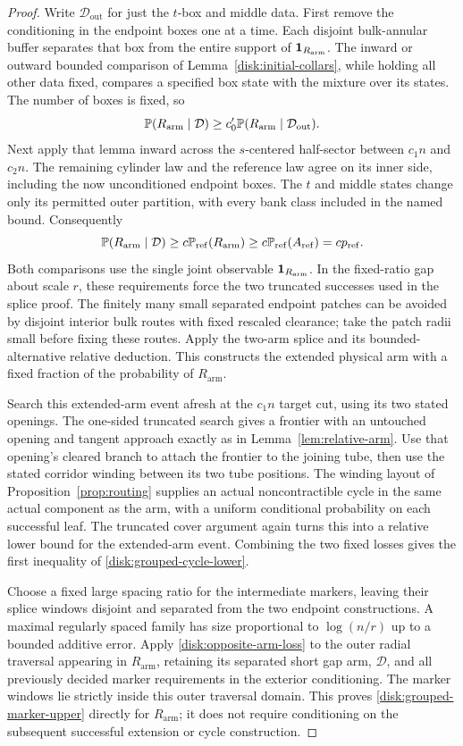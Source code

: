 \begin{proof}
Write $\mathcal D_{\mathrm{out}}$ for just the $t$-box and middle data.
First remove the conditioning in the endpoint boxes one at a time.
Each disjoint bulk-annular buffer separates that box from the entire
support of $\mathbf 1_{R_{\mathrm{arm}}}$. The inward or outward bounded
comparison of Lemma~\ref{disk:initial-collars}, while holding all
other data fixed, compares a specified box state with the mixture over
its states. The number of boxes is fixed, so
\[
 \mathbb P(R_{\mathrm{arm}}\mid\mathcal D)
 \ge c_0'\mathbb P(R_{\mathrm{arm}}\mid\mathcal D_{\mathrm{out}}).
\]
Next apply that lemma inward across the $s$-centered half-sector
between $c_1n$ and $c_2n$. The remaining cylinder law and the
reference law agree on its inner side, including the now unconditioned
endpoint boxes. The $t$ and middle states change only its permitted
outer partition, with every bank class included in the named bound.
Consequently
\[
 \mathbb P(R_{\mathrm{arm}}\mid\mathcal D)
   \ge c\mathbb P_{\mathrm{ref}}(R_{\mathrm{arm}})
   \ge c\mathbb P_{\mathrm{ref}}(A_{\mathrm{ref}})=c p_{\mathrm{ref}}.
\]
Both comparisons use the single joint observable
$\mathbf 1_{R_{\mathrm{arm}}}$. In the fixed-ratio gap about scale $r$,
these requirements force the
two truncated successes used in the splice proof. The finitely
many small separated endpoint patches can be avoided by disjoint
interior bulk routes with fixed rescaled clearance; take the patch
radii small before fixing these routes. Apply the two-arm splice
and its bounded-alternative relative deduction. This constructs
the extended physical arm with a fixed fraction of the probability
of $R_{\mathrm{arm}}$.

Search this extended-arm event afresh at the $c_1n$ target cut,
using its two stated openings. The one-sided truncated search gives
a frontier with an untouched opening and tangent approach exactly as
in Lemma~\ref{lem:relative-arm}. Use that opening's cleared branch
to attach the frontier to the joining tube, then use the stated
corridor winding between its two tube positions. The winding layout of
Proposition~\ref{prop:routing} supplies an actual noncontractible
cycle in the same actual component as the arm, with a uniform
conditional probability on each successful leaf. The truncated
cover argument again turns this into a relative lower bound for
the extended-arm event. Combining the two fixed losses gives the
first inequality of \eqref{disk:grouped-cycle-lower}.

Choose a fixed large spacing ratio for the intermediate markers,
leaving their splice windows disjoint and separated from the two
endpoint constructions. A maximal regularly spaced family has
size proportional to $\log(n/r)$ up to a bounded additive error. Apply
\eqref{disk:opposite-arm-loss} to the outer radial traversal
appearing in $R_{\mathrm{arm}}$, retaining its separated short
gap arm, $\mathcal D$, and all previously decided marker
requirements in the exterior conditioning. The marker windows
lie strictly inside this outer traversal domain. This proves
\eqref{disk:grouped-marker-upper} directly for
$R_{\mathrm{arm}}$; it does not require conditioning on the
subsequent successful extension or cycle construction.
\end{proof}
